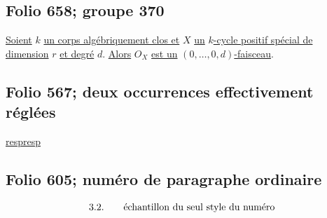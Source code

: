 \documentclass[11pt]{article}
\begin{document}
\subsection*{Folio 658; groupe 370}
\uline{Soient} $k$ \uline{un corps alg\'ebriquement clos et} $X$ \uline{un} $k$\uline{-cycle positif sp\'ecial de dimension} $r$ \uline{et degr\'e} $d$. \uline{Alors} ${O}_X$ \uline{est un} $(0,\ldots,0,d)$\uline{-faisceau}.

\subsection*{Folio 567; deux occurrences effectivement réglées}
\uline{resp}\qquad\uline{resp}
\subsection*{Folio 605; numéro de paragraphe ordinaire}
\[\textnormal{3.2.}\qquad\text{échantillon du seul style du numéro}\]
\end{document}
